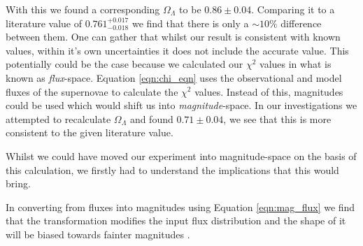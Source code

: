 \documentclass[twocolumn]{revtex4}
\begin{document}
With this we found a corresponding $\Omega_\Lambda$ to be $0.86\pm0.04$. Comparing it to a literature value of $0.761^{+0.017}_{-0.018}$ we find that there is only a $\sim 10 \%$ difference between them. One can gather that whilst our result is consistent with known values, within it's own uncertainties it does not include the accurate value. This potentially could be the case because we calculated our $\chi^2$ values in what is known as \textit{flux}-space. Equation \ref{eqn:chi_eqn} uses the observational and model fluxes of the supernovae to calculate the $\chi^2$ values. Instead of this, magnitudes could be used which would shift us into \textit{magnitude}-space. In our investigations we attempted to recalculate $\Omega_\Lambda$ and found $0.71\pm0.04$, we see that this is more consistent to the given literature value.

Whilst we could have moved our experiment into magnitude-space on the basis of this calculation, we firstly had to understand the implications that this would bring. 

In converting from fluxes into magnitudes using Equation \ref{eqn:mag_flux} we find that the transformation modifies the input flux distribution and the shape of it will be biased towards fainter magnitudes \cite{magspace_stats}. 
\end{document}

